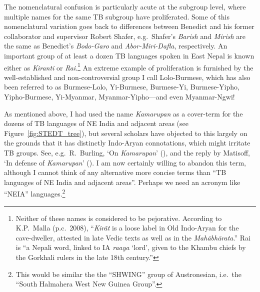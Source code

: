 The nomenclatural confusion is particularly acute at the subgroup level, where multiple names for the same TB subgroup have proliferated.
Some of this nomenclatural variation goes back
to differences between Benedict and his former collaborator and supervisor
Robert Shafer, %
 e.g.\ Shafer’s \textit{Barish} and \textit{Mirish} are the same as Benedict’s
\textit{Bodo-Garo} and \textit{Abor-Miri-Dafla}, respectively. An important group of at least a
dozen TB languages spoken in East Nepal is known either as \textit{Kiranti} or
\textit{Rai}.\footnote{Neither of these names is considered to be pejorative. According to K.P.~Malla (p.c.~2008), “\textit{Kirãt} is a loose label in Old Indo-Aryan for the cave-dweller, attested in late Vedic texts as well as in the \textit{Mahābhārata}.” Rai is “a Nepali word, linked to IA \textit{raaya} ‘lord’, given to the Khambu chiefs by the Gorkhali rulers in the late 18th century.”}
  An extreme example of proliferation is furnished by the well-established and
non-controversial group I call Lolo-Burmese, which has also been referred to as
Burmese-Lolo, Yi-Burmese, Burmese-Yi, Burmese-Yipho, Yipho-Burmese, Yi-Myanmar,
Myanmar-Yipho—and even Myanmar-Ngwi!

As mentioned above, I had used the name \textit{Kamarupan} as a cover-term for the dozens of TB languages of NE India and adjacent areas (see Figure~\ref{fig:STEDT_tree}), but several scholars have objected to this
largely on the grounds that it has distinctly Indo-Aryan connotations, which
might irritate TB groups. See, e.g.\ R.~Burling, ‘On \textit{Kamarupan}’ (\citeyear{RB-OK}), and the reply by Matisoff, ‘In defense of \textit{Kamarupan}’ (\citeyear{JAM-IDK}). 
I am now certainly willing to abandon this term, although I cannot think of any alternative more concise terms than “TB languages of NE India and adjacent areas”. Perhaps we need an acronym like “NEIA” languages.\footnote{This would be similar the the “SHWING” group of Austronesian, i.e.\ the “South Halmahera West New Guinea Group”.}

